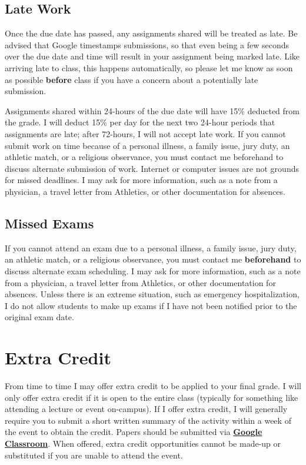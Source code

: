 \documentclass[]{book}
\theoremstyle{definition}
\theoremstyle{definition}
\theoremstyle{definition}
\theoremstyle{remark}
\begin{document}
\hypertarget{late-work}{%
\subsection{Late Work}\label{late-work}}

Once the due date has passed, any assignments shared will be treated as
late. Be advised that Google timestamps submissions, so that even being
a few seconds over the due date and time will result in your assignment
being marked late. Like arriving late to class, this happens
automatically, so please let me know as soon as possible \textbf{before}
class if you have a concern about a potentially late submission.

Assignments shared within 24-hours of the due date will have 15\%
deducted from the grade. I will deduct 15\% per day for the next two
24-hour periods that assignments are late; after 72-hours, I will not
accept late work. If you cannot submit work on time because of a
personal illness, a family issue, jury duty, an athletic match, or a
religious observance, you must contact me beforehand to discuss
alternate submission of work. Internet or computer issues are not
grounds for missed deadlines. I may ask for more information, such as a
note from a physician, a travel letter from Athletics, or other
documentation for absences.

\hypertarget{missed-exams}{%
\subsection{Missed Exams}\label{missed-exams}}

If you cannot attend an exam due to a personal illness, a family issue,
jury duty, an athletic match, or a religious observance, you must
contact me \textbf{beforehand} to discuss alternate exam scheduling. I
may ask for more information, such as a note from a physician, a travel
letter from Athletics, or other documentation for absences. Unless there
is an extreme situation, such as emergency hospitalization, I do not
allow students to make up exams if I have not been notified prior to the
original exam date.

\hypertarget{extra-credit}{%
\section{Extra Credit}\label{extra-credit}}

From time to time I may offer extra credit to be applied to your final
grade. I will only offer extra credit if it is open to the entire class
(typically for something like attending a lecture or event on-campus).
If I offer extra credit, I will generally require you to submit a short
written summary of the activity within a week of the event to obtain the
credit. Papers should be submitted via
\textbf{\href{https://classroom.google.com}{Google Classroom}}. When
offered, extra credit opportunities cannot be made-up or substituted if
you are unable to attend the event.
\end{document}
